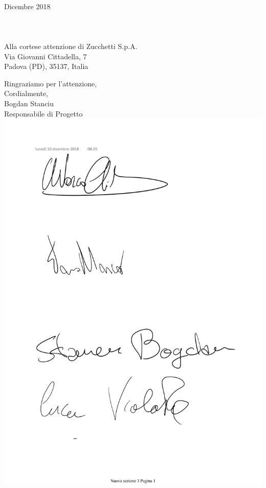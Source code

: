 \documentclass[11pt, a4paper]{letter} %
\begin{document}
\begin{letter}{
	\-\\ Dicembre 2018
	\-\\\-\\\-\\\-\\
	Alla cortese attenzione di Zucchetti S.p.A.\\
	Via Giovanni Cittadella, 7\\
	Padova (PD), 35137, Italia
}
\closing{Ringraziamo per l'attenzione,\\
Cordialmente,\\
Bogdan Stanciu\\
Responsabile di Progetto
\includegraphics[scale=0.4]{images/BogdanStanciu.pdf}}




\end{letter}
\end{document}
